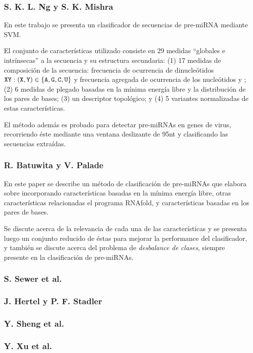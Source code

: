 \documentclass[12pt,bibliography=oldstyle,DIV=12,parskip=half-,titlepage]{scrartcl}
\begin{document}
\subsubsection*{S. K. L. Ng y S. K. Mishra \cite{ng}}
%
En este trabajo se presenta un clasificador de secuencias de
pre-miRNA mediante SVM.

El conjunto de características utilizado consiste en 29 medidas
``globales e intrínsecas'' a la secuencia y su estructura secundaria:
(1) 17 medidas de composición de la secuencia: frecuencia de
ocurrencia de dinucleótidos
${\tt XY}:({\tt X},{\tt Y})\in\{{\tt A},{\tt G},{\tt C},{\tt U}\}$
y frecuencia agregada de ocurrencia de los nucleótidos  y
; (2) 6 medidas de plegado basadas en la mínima energía libre
y la distribución de los pares de bases; (3) un descriptor
topológico; y (4) 5 variantes normalizadas de estas características.

El método además es probado para detectar pre-miRNAs en genes de
virus, recorriendo éste mediante una ventana deslizante de 95nt y
clasificando las secuencias extraídas.
%
\subsubsection*{R. Batuwita y V. Palade \cite{batuwita}}
En este paper se describe un método de clasificación de pre-miRNAs que
elabora sobre \cite{ng} incorporando características basadas en la
mínima energía libre, otras características relacionadas el programa
RNAfold, y características basadas en los pares de bases.

Se discute acerca de la relevancia de cada una de las características
y se presenta luego un conjunto reducido de éstas para mejorar la
performance del clasificador, y también se discute acerca del problema
de \emph{desbalance de clases}, siempre presente en la
clasificación de pre-miRNAs.
%
\subsubsection*{S. Sewer et al. \cite{sewer}}
%
\subsubsection*{J. Hertel y P. F. Stadler \cite{hertel}}
%
\subsubsection*{Y. Sheng et al. \cite{sheng}}
%
\subsubsection*{Y. Xu et al. \cite{xu}}
%
\end{document}
